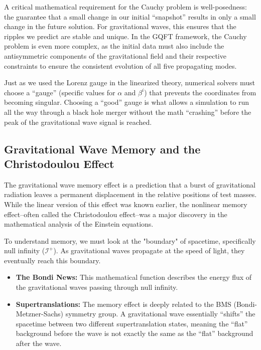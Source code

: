 A critical mathematical requirement for the Cauchy problem is well-posedness: the guarantee that a small change in our initial ``snapshot'' results in only a small change in the future solution. For gravitational waves, this ensures that the ripples we predict are stable and unique. In the GQFT framework, the Cauchy problem is even more complex, as the initial data must also include the antisymmetric components of the gravitational field and their respective constraints to ensure the consistent evolution of all five propagating modes.

Just as we used the Lorenz gauge in the linearized theory, numerical solvers must choose a ``gauge'' (specific values for $\alpha$ and $\beta^i$) that prevents the coordinates from becoming singular. Choosing a ``good'' gauge is what allows a simulation to run all the way through a black hole merger without the math ``crashing'' before the peak of the gravitational wave signal is reached.

\subsection{Gravitational Wave Memory and the Christodoulou Effect} The gravitational wave memory effect is a prediction that a burst of gravitational radiation leaves a permanent displacement in the relative positions of test masses. While the linear version of this effect was known earlier, the nonlinear memory effect--often called the Christodoulou effect--was a major discovery in the mathematical analysis of the Einstein equations.

To understand memory, we must look at the "boundary" of spacetime, specifically null infinity ($\mathcal{I}^+$). As gravitational waves propagate at the speed of light, they eventually reach this boundary.
\begin{itemize}
  \item \textbf{The Bondi News:} This mathematical function describes the energy flux of the gravitational waves passing through null infinity.
  \item \textbf{Supertranslations:} The memory effect is deeply related to the BMS (Bondi-Metzner-Sachs) symmetry group. A gravitational wave essentially ``shifts'' the spacetime between two different supertranslation states, meaning the ``flat'' background before the wave is not exactly the same as the ``flat'' background after the wave.
\end{itemize}

